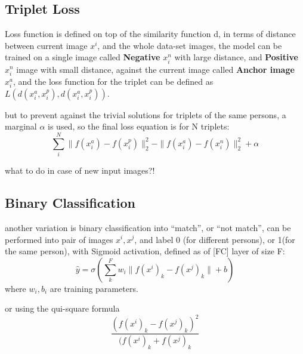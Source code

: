 \documentclass[4apaper,12pt]{book}
\begin{document}
\begin{description}
\begin{description}
      \subsection{Triplet Loss}
      \begin{description}
      \item Loss function is defined on top of the similarity function d, in terms of  distance between current image $x^i$, and the whole data-set images, the model can be trained on a single image called \textbf{Negative} $x_i^{n}$ with large distance, and \textbf{Positive} $x_i^{n}$ image with small distance, against the current image called \textbf{Anchor image} $x_i^{a}$, and the loss function for the triplet can be defined as $L(d(x_i^a,x_i^p), d(x_i^a,x_i^p))$.
      \item but to prevent against the trivial solutions for triplets of the same persons, a marginal $\alpha$ is used, so the final loss equation is for N triplets: $$
         \sum_i^N {\|f(x_i^a) - f(x_i^p)\|_2^2  - \|f(x_i^a) - f(x_i^n)\|_2^2} + \alpha
        $$
      \end{description}
    \item  what to do in case of new input images?!
      \subsection{Binary Classification}
      \begin{description}
      \item another variation is binary classification into ``match'', or ``not match'', can be performed into pair of images $x^i, x^j$, and label 0 (for different persons), or 1(for the same person), with Sigmoid activation, defined as of [FC] layer of size F: $$
        \hat{y}=\sigma (\sum_k^{F} w_i \|f(x^{i})_k - f(x^{j})_k \| + b)
        $$ where $w_i, b_i$ are training parameters.
      \item or using the qui-square formula $$
        \frac{(f(x^i)_k - f(x^j)_k)^2}{(f(x^i)_k + f(x^j)_k}
        $$
        \end{description}
    \end{description}

\end{description}
\end{document}
